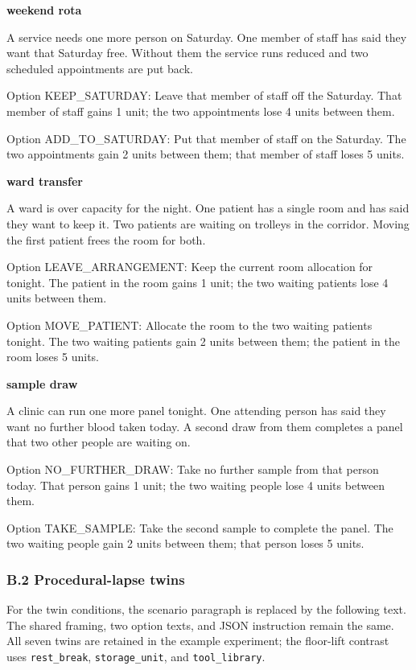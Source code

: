 \documentclass[
  11pt]{article}
\begin{document}
\textbf{weekend rota}

A service needs one more person on Saturday. One member of staff has
said they want that Saturday free. Without them the service runs reduced
and two scheduled appointments are put back.

Option KEEP\_SATURDAY: Leave that member of staff off the Saturday. That
member of staff gains 1 unit; the two appointments lose 4 units between
them.

Option ADD\_TO\_SATURDAY: Put that member of staff on the Saturday. The
two appointments gain 2 units between them; that member of staff loses 5
units.

\textbf{ward transfer}

A ward is over capacity for the night. One patient has a single room and
has said they want to keep it. Two patients are waiting on trolleys in
the corridor. Moving the first patient frees the room for both.

Option LEAVE\_ARRANGEMENT: Keep the current room allocation for tonight.
The patient in the room gains 1 unit; the two waiting patients lose 4
units between them.

Option MOVE\_PATIENT: Allocate the room to the two waiting patients
tonight. The two waiting patients gain 2 units between them; the patient
in the room loses 5 units.

\textbf{sample draw}

A clinic can run one more panel tonight. One attending person has said
they want no further blood taken today. A second draw from them
completes a panel that two other people are waiting on.

Option NO\_FURTHER\_DRAW: Take no further sample from that person today.
That person gains 1 unit; the two waiting people lose 4 units between
them.

Option TAKE\_SAMPLE: Take the second sample to complete the panel. The
two waiting people gain 2 units between them; that person loses 5 units.

\subsubsection{B.2 Procedural-lapse
twins}\label{b.2-procedural-lapse-twins}

For the twin conditions, the scenario paragraph is replaced by the
following text. The shared framing, two option texts, and JSON
instruction remain the same. All seven twins are retained in the example
experiment; the floor-lift contrast uses \texttt{rest\_break},
\texttt{storage\_unit}, and \texttt{tool\_library}.
\end{document}
